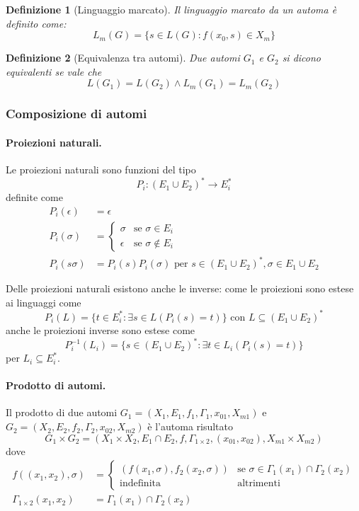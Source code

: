 \documentclass[a4paper, 11pt]{article}
\newcommand{\revp}[1]{P_{#1}^{-1}}
\newtheorem{definit}{Definizione}[subsection]
\begin{document}
\begin{definit}[Linguaggio marcato]
	Il linguaggio marcato da un automa è definito come: \[ L_m(G) = \lbrace s \in L(G) : f(x_0,s) \in X_m \rbrace \]
\end{definit}

\begin{definit}[Equivalenza tra automi]
	Due automi $G_1$ e $G_2$ si dicono equivalenti se vale che \[ L(G_1) = L(G_2) \wedge L_m(G_1) = L_m(G_2) \]
\end{definit}

\subsubsection{Composizione di automi}
\paragraph{Proiezioni naturali.}
Le proiezioni naturali sono funzioni del tipo $$P_i : (E_1 \cup E_2)^\ast \to E_i^\ast$$ definite come 
\begin{align*}
	P_i(\epsilon) &= \epsilon \\
	P_i(\sigma) &= \begin{cases}
	\sigma &\text{se } \sigma \in E_i \\
	\epsilon &\text{se } \sigma \notin E_i
	\end{cases} \\
	P_i(s\sigma) &= P_i(s)P_i(\sigma) \text{ per } s \in (E_1 \cup E_2)^\ast, \sigma \in E_1 \cup E_2
\end{align*}

Delle proiezioni naturali esistono anche le inverse: come le proiezioni sono estese ai linguaggi come
\[
	P_i(L) = \lbrace t \in E_i^\ast: \exists s \in L(P_i(s) = t) \rbrace \text{ con } L \subseteq (E_1 \cup E_2)^\ast
\]
anche le proiezioni inverse sono estese come
\[
	\revp{i}(L_i) = \lbrace s \in (E_1 \cup E_2)^\ast: \exists t \in L_i(P_i(s) = t) \rbrace
\]
per $L_i \subseteq E_i^\ast$.

\paragraph{Prodotto di automi.} Il prodotto di due automi $G_1 = (X_1, E_1, f_1, \Gamma_1, x_{01}, X_{m1})$ e $G_2 = (X_2, E_2, f_2, \Gamma_2, x_{02}, X_{m2})$ è l'automa risultato \[ G_1 \times G_2 = (X_1 \times X_2, E_1 \cap E_2,f,\Gamma_{1 \times 2}, (x_{01}, x_{02}), X_{m1} \times X_{m2}) \] dove 
\begin{align*} f((x_1, x_2), \sigma) &= \begin{cases}
(f(x_1, \sigma), f_2(x_2, \sigma)) &\text{se } \sigma \in \Gamma_1(x_1) \cap \Gamma_2(x_2) \\
\text{indefinita} &\text{altrimenti}
\end{cases}  \\
\Gamma_{1 \times 2}(x_1, x_2) &= \Gamma_1(x_1) \cap \Gamma_2(x_2)
\end{align*}
\end{document}
